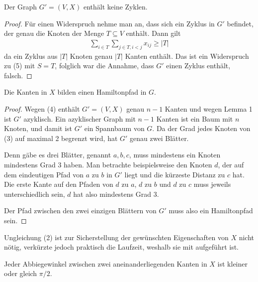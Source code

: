 \documentclass[a4paper, 10pt, ngerman]{article}
\begin{document}
\begin{lemma}
    Der Graph $G' = (V, X)$ enthält keine Zyklen.
\end{lemma}

\begin{proof}
    Für einen Widerspruch nehme man an, dass sich ein Zyklus in $G'$ befindet, der genau die Knoten der Menge $T \subseteq V$ enthält. Dann gilt
    \begin{align*}
        \sum_{i \in T} \sum_{j \in T, i < j} x_{ij} \ge |T|
    \end{align*}
    da ein Zyklus aus $|T|$ Knoten genau $|T|$ Kanten enthält. Das ist ein Widerspruch zu (5) mit $S = T$, folglich war die Annahme, dass $G'$ einen Zyklus enthält, falsch.
\end{proof}

\begin{lemma}
    Die Kanten in $X$ bilden einen Hamiltonpfad in $G$.
\end{lemma}

\begin{proof}
    Wegen (4) enthält $G' = (V, X)$ genau $n - 1$ Kanten und wegen Lemma 1 ist $G'$ azyklisch. Ein azyklischer Graph mit $n - 1$ Kanten ist ein Baum mit $n$ Knoten, und damit ist $G'$ ein Spannbaum von $G$. Da der Grad jedes Knoten von (3) auf maximal 2 begrenzt wird, hat $G'$ genau zwei Blätter.
    
    Denn gäbe es drei Blätter, genannt $a, b, c$, muss mindestens ein Knoten mindestens Grad 3 haben. Man betrachte beispielsweise den Knoten $d$, der auf dem eindeutigen Pfad von $a$ zu $b$ in $G'$ liegt und die kürzeste Distanz zu $c$ hat. Die erste Kante auf den Pfaden von $d$ zu $a$, $d$ zu $b$ und $d$ zu $c$ muss jeweils unterschiedlich sein, $d$ hat also mindestens Grad 3.
    
    Der Pfad zwischen den zwei einzigen Blättern von $G'$ muss also ein Hamiltonpfad sein.
\end{proof}
 
Ungleichung (2) ist zur Sicherstellung der gewünschten Eigenschaften von $X$ nicht nötig, verkürzte jedoch praktisch die Laufzeit, weshalb sie mit aufgeführt ist.

\begin{lemma}
    Jeder Abbiegewinkel zwischen zwei aneinanderliegenden Kanten in $X$ ist kleiner oder gleich $\pi / 2$.
\end{lemma}
\end{document}
